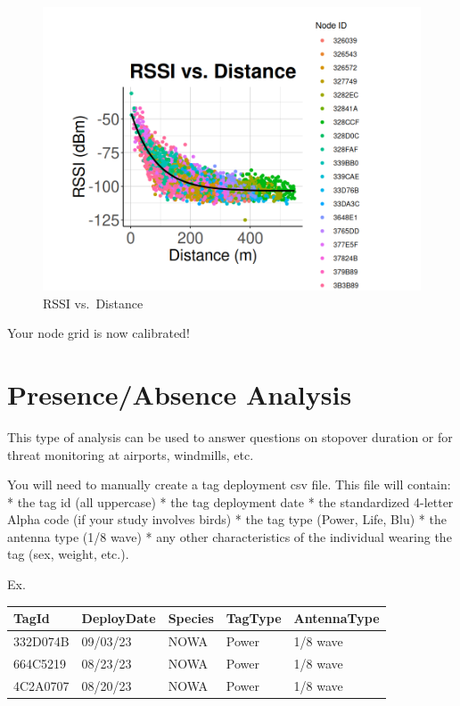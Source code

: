 \documentclass[
]{book}
\begin{document}
\begin{figure}
\centering
\includegraphics{images/node_calibration_3.1_fit_relationship.png}
\caption{RSSI vs.~Distance}
\end{figure}

Your node grid is now calibrated!

\chapter{Presence/Absence Analysis}\label{presenceabsence-analysis}

This type of analysis can be used to answer questions on stopover duration or for threat monitoring at airports, windmills, etc.

You will need to manually create a tag deployment csv file. This file will contain:
* the tag id (all uppercase)
* the tag deployment date
* the standardized 4-letter Alpha code (if your study involves birds)
* the tag type (Power, Life, Blu)
* the antenna type (1/8 wave)
* any other characteristics of the individual wearing the tag (sex, weight, etc.).

Ex.

\begin{longtable}[]{@{}lllll@{}}
\toprule\noalign{}
TagId & DeployDate & Species & TagType & AntennaType \\
\midrule\noalign{}
\endhead
\bottomrule\noalign{}
\endlastfoot
332D074B & 09/03/23 & NOWA & Power & 1/8 wave \\
664C5219 & 08/23/23 & NOWA & Power & 1/8 wave \\
4C2A0707 & 08/20/23 & NOWA & Power & 1/8 wave \\
\end{longtable}
\end{document}
